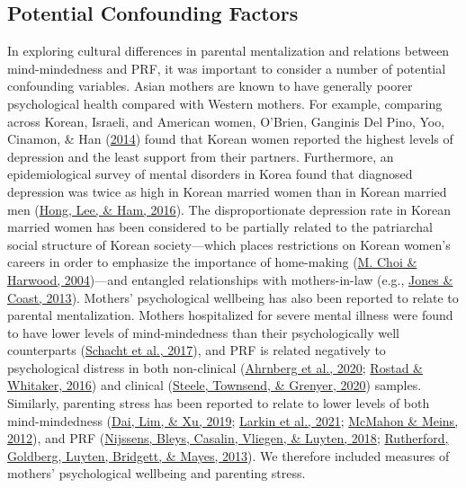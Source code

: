 \documentclass[
]{article}
\begin{document}
\hypertarget{potential-confounding-factors}{%
\subsection*{Potential Confounding Factors}\label{potential-confounding-factors}}

In exploring cultural differences in parental mentalization and relations between mind-mindedness and PRF, it was important to consider a number of potential confounding variables. Asian mothers are known to have generally poorer psychological health compared with Western mothers. For example, comparing across Korean, Israeli, and American women, O'Brien, Ganginis Del Pino, Yoo, Cinamon, \& Han (\protect\hyperlink{ref-OBrien2014}{2014}) found that Korean women reported the highest levels of depression and the least support from their partners. Furthermore, an epidemiological survey of mental disorders in Korea found that diagnosed depression was twice as high in Korean married women than in Korean married men (\protect\hyperlink{ref-Hong2016}{Hong, Lee, \& Ham, 2016}). The disproportionate depression rate in Korean married women has been considered to be partially related to the patriarchal social structure of Korean society---which places restrictions on Korean women's careers in order to emphasize the importance of home-making (\protect\hyperlink{ref-Choi2004}{M. Choi \& Harwood, 2004})---and entangled relationships with mothers-in-law (e.g., \protect\hyperlink{ref-Jones2013}{Jones \& Coast, 2013}). Mothers' psychological wellbeing has also been reported to relate to parental mentalization. Mothers hospitalized for severe mental illness were found to have lower levels of mind-mindedness than their psychologically well counterparts (\protect\hyperlink{ref-Schacht2017}{Schacht et al., 2017}), and PRF is related negatively to psychological distress in both non-clinical (\protect\hyperlink{ref-Ahrnberg2020}{Ahrnberg et al., 2020}; \protect\hyperlink{ref-Rostad2016}{Rostad \& Whitaker, 2016}) and clinical (\protect\hyperlink{ref-Steele2020}{Steele, Townsend, \& Grenyer, 2020}) samples. Similarly, parenting stress has been reported to relate to lower levels of both mind-mindedness (\protect\hyperlink{ref-Dai2019a}{Dai, Lim, \& Xu, 2019}; \protect\hyperlink{ref-Larkin2021}{Larkin et al., 2021}; \protect\hyperlink{ref-McMahon2012}{McMahon \& Meins, 2012}), and PRF (\protect\hyperlink{ref-Nijssens2018}{Nijssens, Bleys, Casalin, Vliegen, \& Luyten, 2018}; \protect\hyperlink{ref-Rutherford2013}{Rutherford, Goldberg, Luyten, Bridgett, \& Mayes, 2013}). We therefore included measures of mothers' psychological wellbeing and parenting stress.
\end{document}
